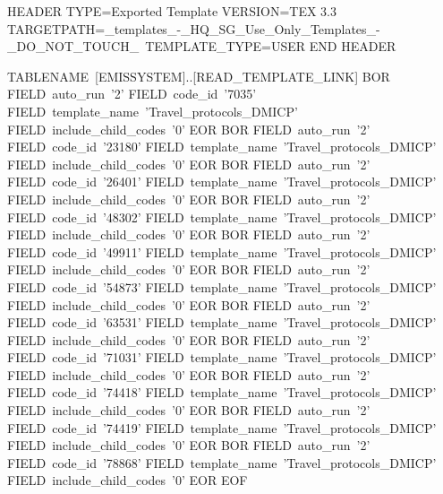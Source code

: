 HEADER
TYPE=Exported Template
VERSION=TEX 3.3
TARGETPATH=\Live_templates_-_HQ_SG_Use_Only\Protocol_Templates_-_DO_NOT_TOUCH_\
TEMPLATE_TYPE=USER
END HEADER

TABLENAME~[EMISSYSTEM]..[READ_TEMPLATE_LINK]
  BOR
    FIELD~auto_run~'2'
    FIELD~code_id~'7035'
    FIELD~template_name~'Travel_protocols_DMICP'
    FIELD~include_child_codes~'0'
  EOR
  BOR
    FIELD~auto_run~'2'
    FIELD~code_id~'23180'
    FIELD~template_name~'Travel_protocols_DMICP'
    FIELD~include_child_codes~'0'
  EOR
  BOR
    FIELD~auto_run~'2'
    FIELD~code_id~'26401'
    FIELD~template_name~'Travel_protocols_DMICP'
    FIELD~include_child_codes~'0'
  EOR
  BOR
    FIELD~auto_run~'2'
    FIELD~code_id~'48302'
    FIELD~template_name~'Travel_protocols_DMICP'
    FIELD~include_child_codes~'0'
  EOR
  BOR
    FIELD~auto_run~'2'
    FIELD~code_id~'49911'
    FIELD~template_name~'Travel_protocols_DMICP'
    FIELD~include_child_codes~'0'
  EOR
  BOR
    FIELD~auto_run~'2'
    FIELD~code_id~'54873'
    FIELD~template_name~'Travel_protocols_DMICP'
    FIELD~include_child_codes~'0'
  EOR
  BOR
    FIELD~auto_run~'2'
    FIELD~code_id~'63531'
    FIELD~template_name~'Travel_protocols_DMICP'
    FIELD~include_child_codes~'0'
  EOR
  BOR
    FIELD~auto_run~'2'
    FIELD~code_id~'71031'
    FIELD~template_name~'Travel_protocols_DMICP'
    FIELD~include_child_codes~'0'
  EOR
  BOR
    FIELD~auto_run~'2'
    FIELD~code_id~'74418'
    FIELD~template_name~'Travel_protocols_DMICP'
    FIELD~include_child_codes~'0'
  EOR
  BOR
    FIELD~auto_run~'2'
    FIELD~code_id~'74419'
    FIELD~template_name~'Travel_protocols_DMICP'
    FIELD~include_child_codes~'0'
  EOR
  BOR
    FIELD~auto_run~'2'
    FIELD~code_id~'78868'
    FIELD~template_name~'Travel_protocols_DMICP'
    FIELD~include_child_codes~'0'
  EOR
EOF

